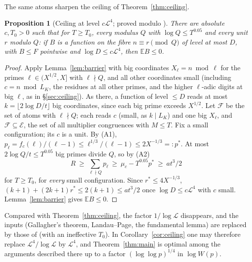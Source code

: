 \documentclass[11pt,reqno]{amsart}
\newtheorem{proposition}[theorem]{Proposition}
\theoremstyle{definition}
\newcommand{\Lc}{\mathcal L}
\newcommand{\E}{\mathbb E}
\begin{document}
The same atoms sharpen the ceiling of Theorem~\ref{thm:ceiling}.

\begin{proposition}[Ceiling at level $c\Lc^4$; proved modulo \cite{TQ}]\label{prop:ceiling4}
There are absolute $c,T_0>0$ such that for $T\ge T_0$, every modulus $Q$ with
$\log Q\le T^{0.05}$ and every unit $r$ modulo $Q$: if $B$ is a function on the
fibre $n\equiv r\pmod Q$ of level at most $D$, with $B\le F$ pointwise and
$\log D\le c\Lc^4$, then $\E B\le0$.
\end{proposition}

\begin{proof}
Apply Lemma~\ref{lem:barrier} with big coordinates $X_\ell=n\bmod\ell$ for the
primes $\ell\in(X^{1/2},X]$ with $\ell\nmid Q$, and all other coordinates small
(including $c=n\bmod L_K$, the residues at all other primes, and the higher
$\ell$-adic digits at big $\ell$, as in \S\ref{sec:ceiling}).  As there, a function
of level $\le D$ reads at most $k=\lfloor2\log D/t\rfloor$ big coordinates, since each
big prime exceeds $X^{1/2}$.  Let $\mathcal F$ be the set of atoms with $\ell\nmid Q$;
each reads $c$ (small, as $k\mid L_K$) and one big $X_\ell$, and
$\mathcal F\subseteq\mathcal E$, the set of all multiplier congruences with $M\le T$.  Fix a
small configuration; its $c$ is a unit.  By (A1), $p_\ell=f_c(\ell)/(\ell-1)\le
\ell^{1/3}/(\ell-1)\le2X^{-1/3}=:p^*$.  At most $2\log Q/t\le T^{0.05}$ big primes
divide $Q$, so by (A2)
\[
 R\ \ge\ \sum_{\ell\nmid Q}p_\ell\ \ge\ \mu_c-T^{0.05}p^*\ \ge\ at^3/2
\]
for $T\ge T_0$, for \emph{every} small configuration.  Since $r^*\le4X^{-1/3}$,
$(k+1)+(2k+1)r^*\le2(k+1)\le at^3/2$ once $\log D\le c\Lc^4$ with $c$ small.  Lemma~\ref{lem:barrier}
gives $\E B\le0$.
\end{proof}

Compared with Theorem~\ref{thm:ceiling}, the factor $1/\log\Lc$ disappears,
and the inputs (Gallagher's theorem, Landau--Page, the fundamental lemma)
are replaced by those of \cite{TQ} (with an ineffective $T_0$).  In
Corollary~\ref{cor:ceiling} one may therefore replace $\Lc^4/\log\Lc$ by $\Lc^4$, and
Theorem~\ref{thm:main} is optimal among the arguments described there up to
a factor $(\log\log p)^{1/4}$ in $\log W(p)$.
\end{document}
